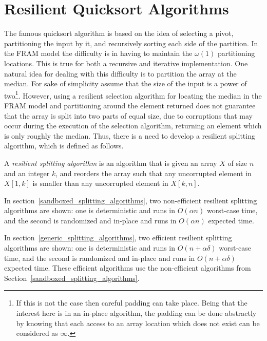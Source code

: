\documentclass{llncs}
\begin{document}
\section{Resilient Quicksort Algorithms}
\label{sec:resilient_quicksort_algorithms}

The famous quicksort algorithm is based on the idea of selecting a pivot, partitioning the input by it, and recursively sorting each side of the partition. In the FRAM model the difficulty is in having to maintain the $\omega(1)$ partitioning locations. This is true for both a recursive and iterative implementation. One natural idea for dealing with this difficulty is to partition the array at the median. For sake of simplicity assume that the size of the input is a power of two\footnote{If this is not the case then careful padding can take place. Being that the interest here is in an in-place algorithm, the padding can be done abstractly by knowing that each access to an array location which does not exist can be considered as $\infty$.}. However, using a resilient selection algorithm for locating the median in the FRAM model and partitioning around the element returned does not guarantee that the array is split into two parts of equal size, due to corruptions that may occur during the execution of the selection algorithm, returning an element which is only roughly the median. Thus, there is a need to develop a resilient splitting algorithm, which is defined as follows.

\begin{definition}
A \emph{resilient splitting algorithm} is an algorithm that is given an array $X$ of size $n$ and an integer $k$, and reorders the array such that any uncorrupted element in $X[1, k]$ is smaller than any uncorrupted element in $X[k, n]$.
\end{definition}

In section~\ref{sandboxed_splitting_algorithms}, two non-efficient resilient splitting algorithms are shown: one is deterministic and runs in $O(\alpha n)$ worst-case time, and the second is randomized and in-place and runs in $O(\alpha n)$ expected time.

In section~\ref{generic_splitting_algorithms}, two efficient resilient splitting algorithms are shown: one is deterministic and runs in $O(n + \alpha\delta)$ worst-case time, and the second is randomized and in-place and runs in $O(n + \alpha\delta)$ expected time. These efficient algorithms use the non-efficient algorithms from Section~\ref{sandboxed_splitting_algorithms}.
\end{document}
